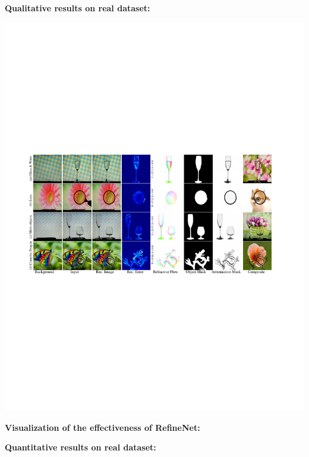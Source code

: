 \documentclass[landscape,a0paper,fontscale=0.292]{baposter}
\begin{document}
\begin{poster}
{    \vspace{0.5em}
    \textbf{\color{blue}Qualitative results on real dataset:}
    \begin{center}
        \vspace{-0.8em}
        \includegraphics[width=0.92\linewidth]{images/real_qual.pdf}
        \vspace{-1em}
    \end{center}

    \vspace{0.5em}
    \begin{minipage}[t]{0.5\linewidth}
        \textbf{\color{blue}Visualization of the effectiveness of RefineNet:}

        
    \end{minipage}
    \begin{minipage}[t]{0.5\linewidth}
        \textbf{\color{blue}Quantitative results on real dataset:}

        


\end{minipage}}
\end{poster}
\end{document}
